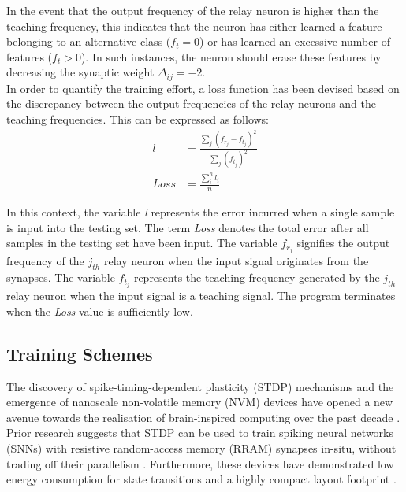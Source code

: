 \noindent In the event that the output frequency of the relay neuron is higher than the teaching frequency, this indicates that the neuron has either learned a feature belonging to an alternative class ($f_t = 0$) or has learned an excessive number of features ($f_t > 0$). In such instances, the neuron should erase these features by decreasing the synaptic weight $\Delta_{ij} = -2$.\\

\noindent In order to quantify the training effort, a loss function has been devised based on the discrepancy between the output frequencies of the relay neurons and the teaching frequencies. This can be expressed as follows:
\begin{align}
l &= \frac{\sum_{j}^{}\left( f_{r_j} - f_{t_j} \right)^2}{\sum_{j}^{}\left( f_{t_j} \right)^2} \label{eq:4.13}\\
Loss &= \frac{\sum_{i}^{n}l_i}{n} \label{eq:4.14}
\end{align}

\noindent In this context, the variable \textit{l} represents the error incurred when a single sample is input into the testing set. The term \textit{Loss} denotes the total error after all samples in the testing set have been input. The variable $f_{r_j}$ signifies the output frequency of the $j_{th}$ relay neuron when the input signal originates from the synapses. The variable $f_{t_j}$ represents the teaching frequency generated by the $j_{th}$ relay neuron when the input signal is a teaching signal. The program terminates when the \textit{Loss} value is sufficiently low.


\subsection[Training Schemes]{Training Schemes}

The discovery of spike-timing-dependent plasticity (STDP) mechanisms and the emergence of nanoscale non-volatile memory (NVM) devices have opened a new avenue towards the realisation of brain-inspired computing over the past decade \cite{zamarreno2011spike}. Prior research suggests that STDP can be used to train spiking neural networks (SNNs) with resistive random-access memory (RRAM) synapses in-situ, without trading off their parallelism \cite{querlioz2012bioinspired}. Furthermore, these devices have demonstrated low energy consumption for state transitions and a highly compact layout footprint \cite{yu2011electronic}.\\


